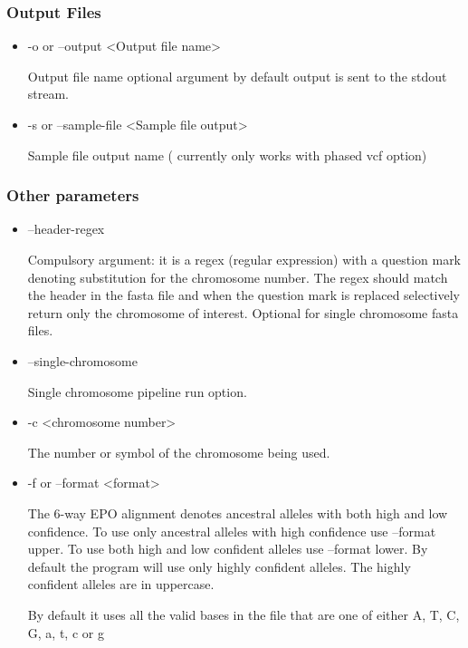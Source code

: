 \documentclass[a4paper,10pt]{article}
\begin{document}
\subsubsection{Output Files}
\begin{itemize}
\item -o or --output <Output file name>

Output file name optional argument by default output is sent to the stdout stream.

\item -s or --sample-file <Sample file output>

Sample file output name ( currently only works with phased vcf option)
\end{itemize}
\subsubsection{Other parameters}
\begin{itemize}
\item --header-regex 

Compulsory argument: it is a regex (regular expression) with a question mark denoting
substitution for the chromosome number. The regex should match the
header in the fasta file and when the question mark is replaced
selectively return only the chromosome of interest. Optional for
single chromosome fasta files.

\item --single-chromosome

Single chromosome pipeline run option.

\item -c <chromosome number>

The number or symbol of the chromosome being used.

\item -f or --format <format>

The 6-way EPO alignment denotes ancestral alleles with both high and
low confidence. To use only ancestral alleles with high confidence use
--format upper. To use both high and low confident alleles use
--format lower. By default the program will use only highly confident
alleles. The highly confident alleles are in uppercase. 

By default it uses all the valid bases in the file that are one  of either A, T, C, G, a, t, c or g

\end{itemize}
\end{document}
